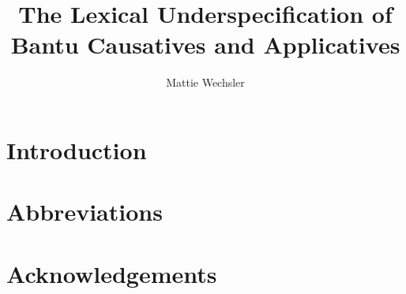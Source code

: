 \documentclass[output=paper]{langsci/langscibook}
\author{Mattie Wechsler\affiliation{}}
\title{The Lexical Underspecification of Bantu Causatives and Applicatives}
\begin{document}
\section{Introduction}  
 
\section*{Abbreviations}
\section*{Acknowledgements}

\sloppy
\printbibliography[heading=subbibliography,notkeyword=this] 
\end{document}
